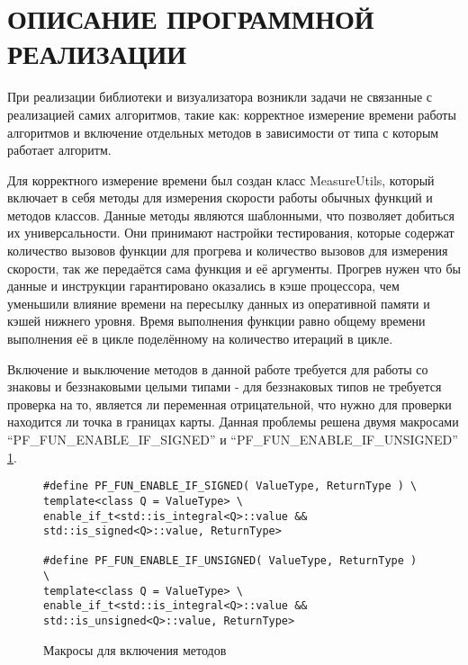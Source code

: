 \section[Описание программной реализации]{\MakeTextUppercase{ОПИСАНИЕ ПРОГРАММНОЙ РЕАЛИЗАЦИИ}}

\vspace{1\baselineskip} 

При реализации библиотеки и визуализатора возникли задачи не связанные с реализацией самих алгоритмов, такие как: корректное измерение времени работы алгоритмов и включение отдельных методов в зависимости от типа с которым работает алгоритм.

Для корректного измерение времени был создан класс MeasureUtils, который включает в себя методы для измерения скорости работы обычных функций и методов классов. Данные методы являются шаблонными, что позволяет добиться их универсальности. Они принимают настройки тестирования, которые содержат количество вызовов функции для прогрева и количество вызовов для измерения скорости, так же передаётся сама функция и её аргументы. Прогрев нужен что бы данные и инструкции гарантировано оказались в кэше процессора, чем уменьшили влияние времени на пересылку данных из оперативной памяти и кэшей нижнего уровня. Время выполнения функции равно общему времени выполнения её в цикле поделённому на количество итераций в цикле.

Включение и выключение методов в данной работе требуется для работы со знаковы и беззнаковыми целыми типами - для беззнаковых типов не требуется проверка на то, является ли переменная отрицательной, что нужно для проверки находится ли точка в границах карты. Данная проблемы решена двумя макросами  ``PF\_FUN\_ENABLE\_IF\_SIGNED'' и ``PF\_FUN\_ENABLE\_IF\_UNSIGNED'' \cref{fig:enable_fun_macro}.

\begin{figure}[!htb]
	\centering
	\captionsetup{justification=centering}
	\begin{lstlisting}
#define PF_FUN_ENABLE_IF_SIGNED( ValueType, ReturnType ) \
template<class Q = ValueType> \
enable_if_t<std::is_integral<Q>::value &&  std::is_signed<Q>::value, ReturnType>

#define PF_FUN_ENABLE_IF_UNSIGNED( ValueType, ReturnType ) \
template<class Q = ValueType> \
enable_if_t<std::is_integral<Q>::value &&  std::is_unsigned<Q>::value, ReturnType>
	\end{lstlisting}
	\caption{Макросы для включения методов}
	\label{fig:enable_fun_macro}
\end{figure}

